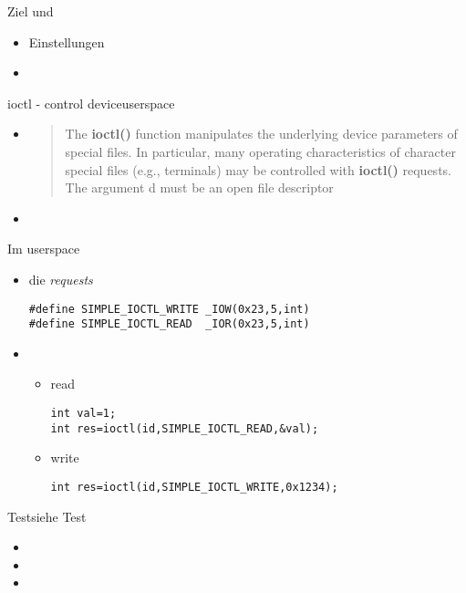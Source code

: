 \begin{frame}{Ziel}{ und }
 \begin{itemize}
  \item Einstellungen
  \item {}
 \end{itemize}
\end{frame}

\begin{frame}{ioctl - control device}{userspace}
\begin{itemize}
 \item {}
\begin{quote}
{\footnotesize
The  {\bf ioctl()} function manipulates the underlying device parameters of special
files.  In particular, many operating characteristics of character special files
(e.g., terminals) may be controlled with {\bf ioctl()} requests.  The argument d
must be an open file descriptor
}
\end{quote}
 \item {}
\end{itemize}
\end{frame}

\begin{frame}[fragile]{Im userspace}{}
\begin{itemize}
 \item die {\em requests} 
 \begin{lstlisting}
#define SIMPLE_IOCTL_WRITE _IOW(0x23,5,int)  
#define SIMPLE_IOCTL_READ  _IOR(0x23,5,int) 
 \end{lstlisting}
 \item {}
 \begin{itemize}
  \item read
  \vspace{-2mm}
  \begin{lstlisting}
int val=1;
int res=ioctl(id,SIMPLE_IOCTL_READ,&val);
  \end{lstlisting}
  \item write
  \vspace{-2mm}
  \begin{lstlisting}
int res=ioctl(id,SIMPLE_IOCTL_WRITE,0x1234);
  \end{lstlisting}
 \end{itemize}
\end{itemize}
\end{frame}

\begin{frame}{Test}{siehe  Test}
 \begin{itemize}
  \item {}
  \item {}
  \item {}
 \end{itemize}
\end{frame}
